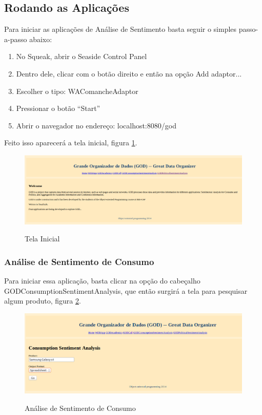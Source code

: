 \newpage
\subsection{Rodando as Aplicações}
Para iniciar as aplicações de Análise de Sentimento basta seguir o simples passo-a-passo abaixo:

\begin{enumerate}
	\item No Squeak, abrir o Seaside Control Panel
	
	\item Dentro dele, clicar com o botão direito e então na opção Add adaptor...
	
	\item Escolher o tipo: WAComancheAdaptor
	
	\item Pressionar o botão ``Start''
	
	\item Abrir o navegador no endereço: localhost:8080/god
\end{enumerate}

Feito isso aparecerá a tela inicial, figura \ref{fig:ini}.

\begin{figure}[h]
\caption{Tela Inicial}
\centering
\includegraphics[width=14cm]{figures/inicio.png}
\label{fig:ini}
\end{figure}

\subsubsection{Análise de Sentimento de Consumo}
Para iniciar essa aplicação, basta clicar na opção do cabeçalho GODConsumptionSentimentAnalysis, que então surgirá a tela para pesquisar algum produto, figura \ref{fig:cons-pesq}.

\begin{figure}[h]
\caption{Análise de Sentimento de Consumo}
\centering
\includegraphics[width=14cm]{figures/consumo-pesquisa.png}
\label{fig:cons-pesq}
\end{figure}

